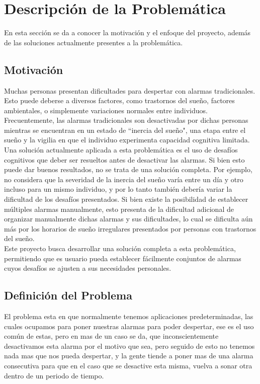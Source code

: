 \section{Descripción de la Problemática}
En esta sección se da a conocer la motivación y el enfoque del proyecto, además de las soluciones actualmente presentes a la problemática.

\subsection{Motivación}
Muchas personas presentan dificultades para despertar con alarmas tradicionales. Esto puede deberse a diversos factores, como trastornos del sueño, factores ambientales, o simplemente variaciones normales entre individuos. Frecuentemente, las alarmas tradicionales son desactivadas por dichas personas mientras se encuentran en un estado de ``inercia del sueño", una etapa entre el sueño y la vigilia en que el individuo experimenta capacidad cognitiva limitada.
\\
Una solución actualmente aplicada a esta problemática es el uso de desafíos cognitivos que deber ser resueltos antes de desactivar las alarmas. Si bien esto puede dar buenos resultados, no se trata de una solución completa. Por ejemplo, no considera que la severidad de la inercia del sueño varía entre un día y otro incluso para un mismo individuo, y por lo tanto también debería variar la dificultad de los desafíos presentados. Si bien existe la posibilidad de establecer múltiples alarmas manualmente, esto presenta de la dificultad adicional de organizar manualmente dichas alarmas y sus dificultades, lo cual se dificulta aún más por los horarios de sueño irregulares presentados por personas con trastornos del sueño.
\\
Este proyecto busca desarrollar una solución completa a esta problemática, permitiendo que es usuario pueda establecer fácilmente conjuntos de alarmas cuyos desafíos se ajusten a sus necesidades personales.

\subsection{Definición del Problema}
El problema esta en que normalmente tenemos aplicaciones predeterminadas, las cuales ocupamos para poner nuestras alarmas para poder despertar, ese es el uso común de estas, pero en mas de un caso se da, que inconscientemente desactivamos esta alarma por el motivo que sea, pero seguido de esto no tenemos nada mas que nos pueda despertar, y la gente tiende a poner mas de una alarma consecutiva para que en el caso que se desactive esta misma, vuelva a sonar otra dentro de un periodo de tiempo.
